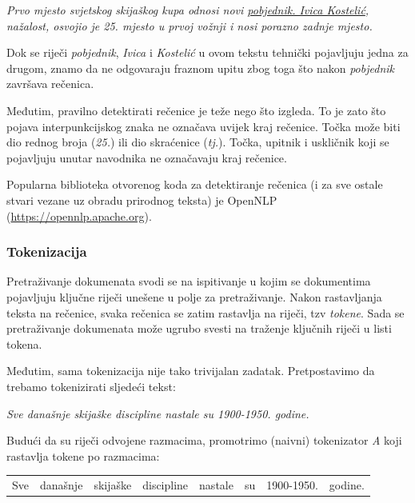 \documentclass[a4paper,twoside,12pt]{scrreprt}
\newenvironment{nscenter}
 {\par\nopagebreak\centering}
 {\parskip=0pt\par\noindent\ignorespacesafterend}
\begin{document}
\begin{quoting}
  \textit{Prvo mjesto svjetskog skijaškog kupa odnosi novi \underline{pobjednik. Ivica Kostelić}, nažalost, osvojio je 25. mjesto u prvoj vožnji i nosi porazno zadnje mjesto.}
\end{quoting}

Dok se riječi \textit{pobjednik}, \textit{Ivica} i \textit{Kostelić} u ovom tekstu tehnički pojavljuju jedna za drugom, znamo da ne odgovaraju fraznom upitu zbog toga što nakon \textit{pobjednik} završava rečenica.

Međutim, pravilno detektirati rečenice je teže nego što izgleda. To je zato što pojava interpunkcijskog znaka ne označava uvijek kraj rečenice. Točka može biti dio rednog broja (\textit{25.}) ili dio skraćenice (\textit{tj.}). Točka, upitnik i uskličnik koji se pojavljuju unutar navodnika ne označavaju kraj rečenice.

Popularna biblioteka otvorenog koda za detektiranje rečenica (i za sve ostale stvari vezane uz obradu prirodnog teksta) je OpenNLP (\url{https://opennlp.apache.org}).

\subsubsection{Tokenizacija}

Pretraživanje dokumenata svodi se na ispitivanje u kojim se dokumentima pojavljuju ključne riječi unešene u polje za pretraživanje. Nakon rastavljanja teksta na rečenice, svaka rečenica se zatim rastavlja na riječi, tzv \textit{tokene}. Sada se pretraživanje dokumenata može ugrubo svesti na traženje ključnih riječi u listi tokena.

Međutim, sama tokenizacija nije tako trivijalan zadatak. Pretpostavimo da trebamo tokenizirati sljedeći tekst:

\begin{quoting}
  \textit{Sve današnje skijaške discipline nastale su 1900-1950. godine.}
\end{quoting}

Budući da su riječi odvojene razmacima, promotrimo (naivni) tokenizator \textit{A} koji rastavlja tokene po razmacima:

\begin{nscenter}
  \begin{tabular}{|c|c|c|c|c|c|c|c|}
    Sve & današnje & skijaške & discipline & nastale & su & 1900-1950. & godine.
  \end{tabular}
\end{nscenter}
\end{document}
